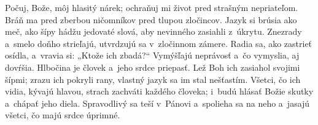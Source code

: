 Počuj, Bože, môj hlasitý nárek;
ochraňuj mi život pred strašným nepriateľom.
\versseparator
Bráň ma pred zberbou ničomníkov
pred tlupou zločincov.
\versseparator
Jazyk si brúsia ako meč,
ako šípy hádžu jedovaté slová,
aby nevinného zasiahli z~úkrytu.
\versseparator
Znezrady a~smelo doňho strieľajú,
utvrdzujú sa v~zločinnom zámere.
\versseparator
Radia sa, ako zastrieť osídla,
a~vravia si: „Ktože ich zbadá?“
\versseparator
Vymýšľajú neprávosť a~čo vymyslia, aj dovŕšia.
Hlbočina je človek a~jeho srdce priepasť.
\versseparator
Lež Boh ich zasiahol svojimi šípmi;
zrazu ich pokryli rany,
vlastný jazyk sa im stal nešťastím.
\versseparator
Všetci, čo ich vidia, kývajú hlavou,
strach zachváti každého človeka;
\versseparator
 i~budú hlásať Božie skutky
a~chápať jeho diela.
\versseparator
Spravodlivý sa teší v~Pánovi a~spolieha sa na neho
a~jasajú všetci, čo majú srdce úprimné.